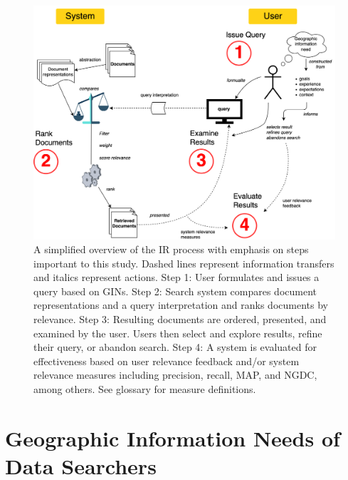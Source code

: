 \begin{figure}
    \centering
    \includegraphics[width=1\textwidth]{../figures/Background_IR_Steps.png}
    \caption{A simplified overview of the IR process with emphasis on steps important to this study. Dashed lines represent information transfers and italics represent actions. Step 1: User formulates and issues a query based on GINs. Step 2: Search system compares document representations and a query interpretation and ranks documents by relevance. Step 3: Resulting documents are ordered, presented, and examined by the user. Users then select and explore results, refine their query, or abandon search. Step 4: A system is evaluated for effectiveness based on user relevance feedback and/or system relevance measures including precision, recall, MAP, and NGDC, among others. See glossary for measure definitions.}
    \label{fig:Background_IR_Steps}
\end{figure}

\section{Geographic Information Needs of Data Searchers}

